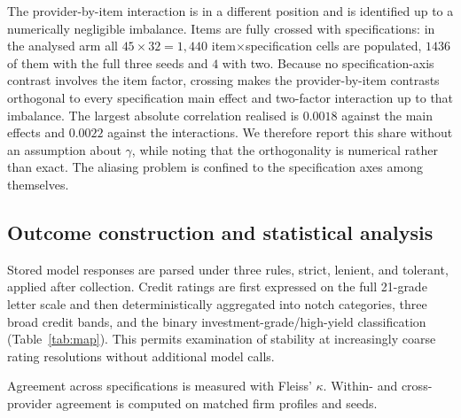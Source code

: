\documentclass[a4paper,fleqn]{cas-sc}
\begin{document}
The provider-by-item interaction is in a different position and is identified up to a
numerically negligible imbalance. Items are fully crossed with specifications: in the analysed arm
all $45\times32=1{,}440$ item$\times$specification cells are populated, $1436$ of them with the full
three seeds and $4$ with two. Because no specification-axis contrast involves the item factor,
crossing makes the provider-by-item contrasts orthogonal to every specification main effect and
two-factor interaction up to that imbalance. The largest absolute correlation realised is $0.0018$
against the main effects and $0.0022$ against the interactions. We therefore report this share
without an assumption about $\gamma$, while noting that the orthogonality is numerical rather than
exact. The aliasing problem is confined to the specification axes among themselves.

\subsection{Outcome construction and statistical analysis}\label{sec:methods-outcome}
Stored model responses are parsed under three rules, strict, lenient, and tolerant, applied after
collection. Credit ratings are first expressed on the full 21-grade letter scale and then
deterministically aggregated into notch categories, three broad credit bands, and the binary
investment-grade/high-yield classification (Table~\ref{tab:map}). This permits examination of stability at
increasingly coarse rating resolutions without additional model calls.

Agreement across specifications is measured with Fleiss' $\kappa$. Within- and cross-provider agreement
is computed on matched firm profiles and seeds.
\end{document}
